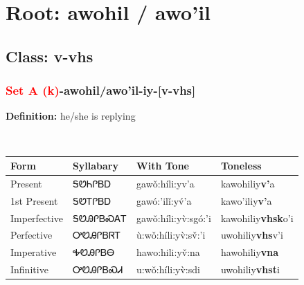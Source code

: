\needspace{4in}
\section*{Root: awohil / awo'il}
\nopagebreak
{}
\needspace{3in}
\subsection*{Class: v-vhs}
\nopagebreak
\needspace{2in}
\subsubsection*{\textcolor{Red}{Set A (k)}{-}\textbf{awohil/awo'il}{-}iy{-}[v-vhs]}
\nopagebreak
\textbf{Definition: } he/she is replying
\\[0.5em]
\begin{tabularx}{\textwidth}{l X X X}%
\toprule%
\textbf{Form}&\textbf{Syllabary}&\textbf{With Tone}&\textbf{Toneless}\\%
\midrule%
Present&ᎦᏬᏂᎵᏴᎠ&gawǒ:híli:yv’a&kawohiliy\textbf{v'}a\\%
1st Present&ᎦᏬᎢᎵᏴᎠ&gawó:’ilǐ:yv́’a&kawo'iliy\textbf{v'}a\\%
Imperfective&ᎦᏬᎯᎵᏴᏍᎪᎢ&gawǒ:híli:yv̀:sgó:’i&kawohiliy\textbf{vhsk}o'i\\%
Perfective&ᎤᏬᎯᎵᏴᏒᎢ&ù:wǒ:híli:yv̀:sv̌:’i&uwohiliy\textbf{vhs}v'i\\%
Imperative&ᎭᏬᎯᎵᏴᎾ&hawo:hili:yv̌:na&hawohiliy\textbf{vna}\\%
Infinitive&ᎤᏬᎯᎵᏴᏍᏗ&u:wǒ:híli:yv̀:sdi&uwohiliy\textbf{vhst}i\\%
\bottomrule%
\end{tabularx}
\\[1em]